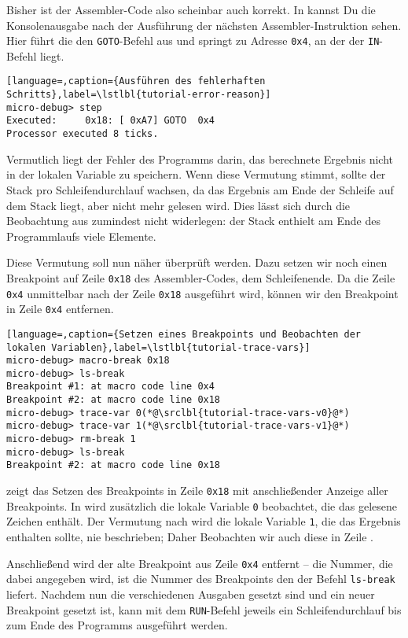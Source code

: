 Bisher ist der Assembler-Code also scheinbar auch korrekt. In  kannst Du die Konsolenausgabe nach der Ausführung der nächsten Assembler-Instruktion sehen. Hier führt die \mic{} den \texttt{GOTO}-Befehl aus und springt zu Adresse \texttt{0x4}, an der der \texttt{IN}-Befehl liegt.

\begin{lstlisting}[language=,caption={Ausführen des fehlerhaften Schritts},label=\lstlbl{tutorial-error-reason}]
micro-debug> step
Executed:     0x18: [ 0xA7] GOTO  0x4
Processor executed 8 ticks.
\end{lstlisting}

Vermutlich liegt der Fehler des Programms darin, das berechnete Ergebnis nicht in der lokalen Variable zu speichern. Wenn diese Vermutung stimmt, sollte der Stack pro Schleifendurchlauf wachsen, da das Ergebnis am Ende der Schleife auf dem Stack liegt, aber nicht mehr gelesen wird. Dies lässt sich durch die Beobachtung aus  zumindest nicht widerlegen: der Stack enthielt am Ende des Programmlaufs viele Elemente.

Diese Vermutung soll nun näher überprüft werden. Dazu setzen wir noch einen Breakpoint auf Zeile \texttt{0x18} des Assembler-Codes, dem Schleifenende. Da die Zeile \texttt{0x4} unmittelbar nach der Zeile \texttt{0x18} ausgeführt wird, können wir den Breakpoint in Zeile \texttt{0x4} entfernen.

\begin{lstlisting}[language=,caption={Setzen eines Breakpoints und Beobachten der lokalen Variablen},label=\lstlbl{tutorial-trace-vars}]
micro-debug> macro-break 0x18
micro-debug> ls-break
Breakpoint #1: at macro code line 0x4
Breakpoint #2: at macro code line 0x18
micro-debug> trace-var 0(*@\srclbl{tutorial-trace-vars-v0}@*)
micro-debug> trace-var 1(*@\srclbl{tutorial-trace-vars-v1}@*)
micro-debug> rm-break 1
micro-debug> ls-break
Breakpoint #2: at macro code line 0x18
\end{lstlisting}

 zeigt das Setzen des Breakpoints in Zeile \texttt{0x18} mit anschließender Anzeige aller Breakpoints. In  wird zusätzlich die lokale Variable \texttt{0} beobachtet, die das gelesene Zeichen enthält. Der Vermutung nach wird die lokale Variable \texttt{1}, die das Ergebnis enthalten sollte, nie beschrieben; Daher Beobachten wir auch diese in Zeile .

Anschließend wird der alte Breakpoint aus Zeile \texttt{0x4} entfernt -- die Nummer, die dabei angegeben wird, ist die Nummer des Breakpoints den der Befehl \texttt{ls-break} liefert. Nachdem nun die verschiedenen Ausgaben gesetzt sind und ein neuer Breakpoint gesetzt ist, kann mit dem \texttt{RUN}-Befehl jeweils ein Schleifendurchlauf bis zum Ende des Programms ausgeführt werden.

